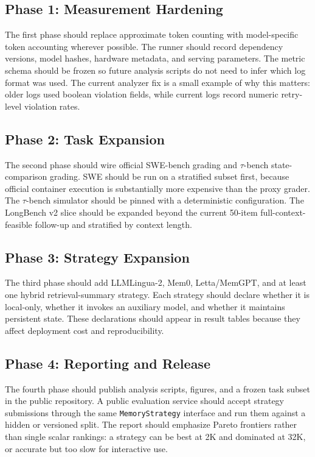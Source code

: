 \documentclass[11pt]{article}
\begin{document}
\subsection{Phase 1: Measurement Hardening}

The first phase should replace approximate token counting with model-specific
token accounting wherever possible.  The runner should record dependency
versions, model hashes, hardware metadata, and serving parameters.  The metric
schema should be frozen so future analysis scripts do not need to infer which
log format was used.  The current analyzer fix is a small example of why this
matters: older logs used boolean violation fields, while current logs record
numeric retry-level violation rates.

\subsection{Phase 2: Task Expansion}

The second phase should wire official SWE-bench grading and $\tau$-bench
state-comparison grading.  SWE should be run on a stratified subset first,
because official container execution is substantially more expensive than the
proxy grader.  The $\tau$-bench simulator should be pinned with a deterministic
configuration.  The LongBench v2 slice should be expanded beyond the current
50-item full-context-feasible follow-up and stratified by context length.

\subsection{Phase 3: Strategy Expansion}

The third phase should add LLMLingua-2, Mem0, Letta/MemGPT, and at least one
hybrid retrieval-summary strategy.  Each strategy should declare whether it is
local-only, whether it invokes an auxiliary model, and whether it maintains
persistent state.  These declarations should appear in result tables because
they affect deployment cost and reproducibility.

\subsection{Phase 4: Reporting and Release}

The fourth phase should publish analysis scripts, figures, and a frozen task subset in the public repository.  A public evaluation service should accept strategy
submissions through the same \texttt{MemoryStrategy} interface and run them
against a hidden or versioned split.  The report should emphasize Pareto
frontiers rather than single scalar rankings: a strategy can be best at 2K and
dominated at 32K, or accurate but too slow for interactive use.
\end{document}
